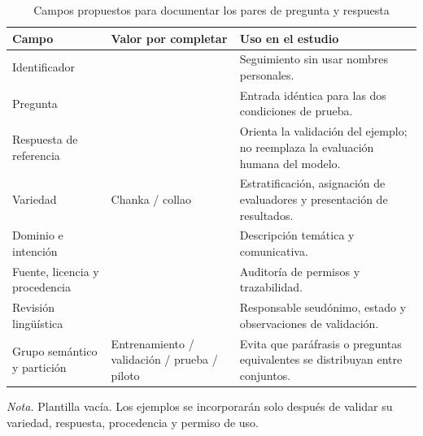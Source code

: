 \begin{table}[H]
\centering
\begin{threeparttable}
\caption{Campos propuestos para documentar los pares de pregunta y respuesta}
\label{tab:plantilla-corpus}
\small
\begin{tabularx}{\textwidth}{@{}P{4.3cm}P{3.8cm}L@{}}
\toprule
\textbf{Campo} & \textbf{Valor por completar} & \textbf{Uso en el estudio} \\
\midrule
Identificador & \rule{0pt}{2.4ex} & Seguimiento sin usar nombres personales. \\
Pregunta & \rule{0pt}{2.4ex} & Entrada idéntica para las dos condiciones de prueba. \\
Respuesta de referencia & \rule{0pt}{2.4ex} & Orienta la validación del ejemplo; no reemplaza la evaluación humana del modelo. \\
Variedad & Chanka / collao & Estratificación, asignación de evaluadores y presentación de resultados. \\
Dominio e intención & \rule{0pt}{2.4ex} & Descripción temática y comunicativa. \\
Fuente, licencia y procedencia & \rule{0pt}{2.4ex} & Auditoría de permisos y trazabilidad. \\
Revisión lingüística & \rule{0pt}{2.4ex} & Responsable seudónimo, estado y observaciones de validación. \\
Grupo semántico y partición & Entrenamiento / validación / prueba / piloto & Evita que paráfrasis o preguntas equivalentes se distribuyan entre conjuntos. \\
\bottomrule
\end{tabularx}
\begin{tablenotes}
\item \textit{Nota.} Plantilla vacía. Los ejemplos se incorporarán solo después de validar su variedad, respuesta, procedencia y permiso de uso.
\end{tablenotes}
\end{threeparttable}
\end{table}
